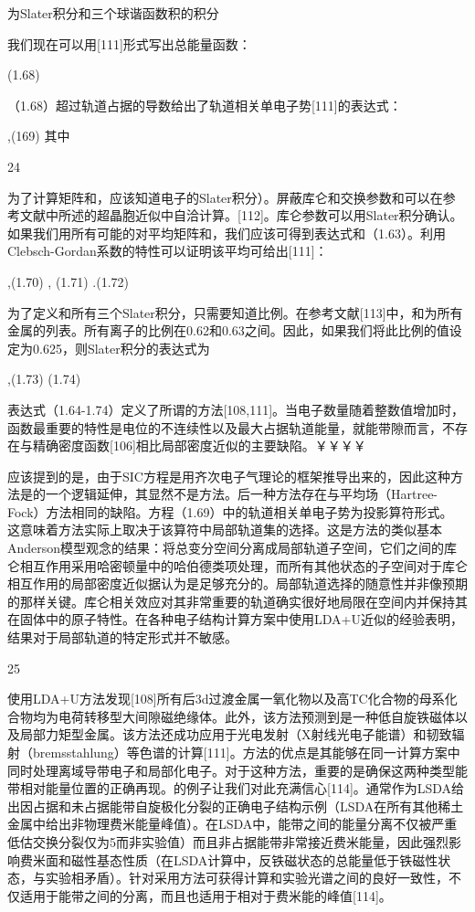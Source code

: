 为Slater积分和三个球谐函数积的积分

我们现在可以用[111]形式写出总能量函数：


(1.68)


（1.68）超过轨道占据的导数给出了轨道相关单电子势[111]的表达式：

,(169)
其中



24

为了计算矩阵和，应该知道电子的Slater积分）。屏蔽库仑和交换参数和可以在参考文献中所述的超晶胞近似中自洽计算。[112]。库仑参数可以用Slater积分确认。如果我们用所有可能的对平均矩阵和，我们应该可得到表达式和（1.63）。利用Clebsch-Gordan系数的特性可以证明该平均可给出[111]：

,(1.70)
,   (1.71)
.(1.72)

为了定义和所有三个Slater积分，只需要知道比例。在参考文献[113]中，和为所有金属的列表。所有离子的比例在0.62和0.63之间。因此，如果我们将此比例的值设定为0.625，则Slater积分的表达式为

,(1.73)
(1.74)

表达式（1.64-1.74）定义了所谓的方法[108,111]。当电子数量随着整数值增加时，函数最重要的特性是电位的不连续性以及最大占据轨道能量，就能带隙而言，不存在与精确密度函数[106]相比局部密度近似的主要缺陷。￥￥￥￥

应该提到的是，由于SIC方程是用齐次电子气理论的框架推导出来的，因此这种方法是的一个逻辑延伸，其显然不是方法。后一种方法存在与平均场（Hartree-Fock）方法相同的缺陷。方程（1.69）中的轨道相关单电子势为投影算符形式。 这意味着方法实际上取决于该算符中局部轨道集的选择。这是方法的类似基本Anderson模型观念的结果：将总变分空间分离成局部轨道子空间，它们之间的库仑相互作用采用哈密顿量中的哈伯德类项处理，而所有其他状态的子空间对于库仑相互作用的局部密度近似据认为是足够充分的。局部轨道选择的随意性并非像预期的那样关键。库仑相关效应对其非常重要的轨道确实很好地局限在空间内并保持其在固体中的原子特性。在各种电子结构计算方案中使用LDA+U近似的经验表明，结果对于局部轨道的特定形式并不敏感。


25


使用LDA+U方法发现[108]所有后3d过渡金属一氧化物以及高TC化合物的母系化合物均为电荷转移型大间隙磁绝缘体。此外，该方法预测到是一种低自旋铁磁体以及局部力矩型金属。该方法还成功应用于光电发射（X射线光电子能谱）和韧致辐射（bremsstahlung）等色谱的计算[111]。方法的优点是其能够在同一计算方案中同时处理离域导带电子和局部化电子。对于这种方法，重要的是确保这两种类型能带相对能量位置的正确再现。的例子让我们对此充满信心[114]。通常作为LSDA给出因占据和未占据能带自旋极化分裂的正确电子结构示例（LSDA在所有其他稀土金属中给出非物理费米能量峰值）。在LSDA中，能带之间的能量分离不仅被严重低估交换分裂仅为5而非实验值）而且非占据能带非常接近费米能量，因此强烈影响费米面和磁性基态性质（在LSDA计算中，反铁磁状态的总能量低于铁磁性状态，与实验相矛盾）。针对采用方法可获得计算和实验光谱之间的良好一致性，不仅适用于能带之间的分离，而且也适用于相对于费米能的峰值[114]。

